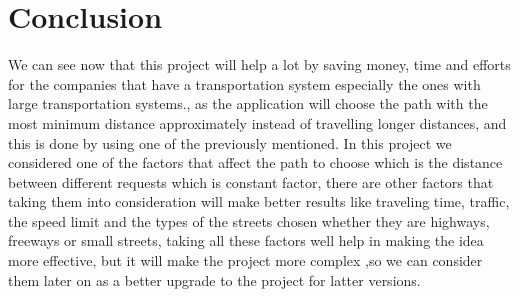 \documentclass[12pt]{article}
\begin{document}
\section{\sc Conclusion}
We can see now that this project will help a lot by saving money, time and efforts for the companies that have a transportation system especially the ones with large transportation systems., as the application will choose the path with the most minimum distance approximately instead of travelling longer distances, and this is done by using one of the previously mentioned. 
In this project we considered one of the factors that affect the path to choose which is the distance between different requests which is constant factor, there are other factors that taking them into consideration will make better results like traveling time, traffic, the speed limit and the types of the streets chosen whether they are highways, freeways or small streets, taking all these factors well help in making the idea more effective, but it will make the project more complex ,so we can consider them later on as a better upgrade to the project for latter versions.
\end{document}
